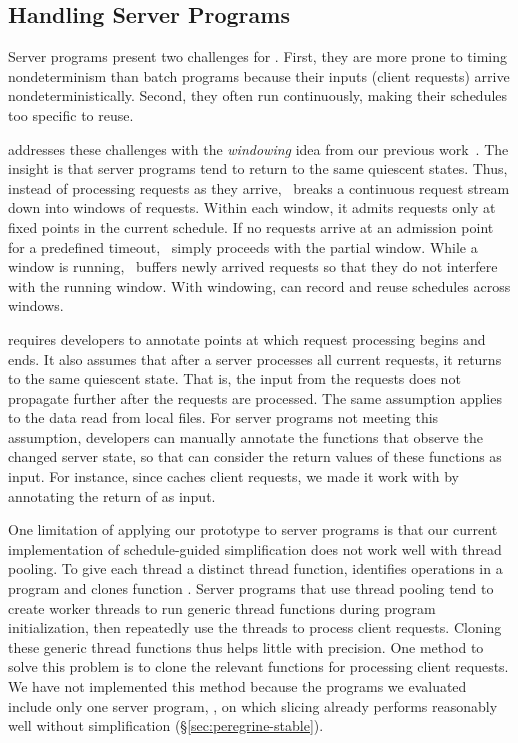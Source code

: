 \subsection{Handling Server Programs} \label{sec:peregrine-window}

Server programs present two challenges for \peregrine.  First, they are more
prone to timing nondeterminism than batch programs because their inputs
(client requests) arrive nondeterministically.  Second, they often run
continuously, making their schedules too specific to reuse.  

\peregrine addresses these challenges with the \emph{windowing} idea from our
previous work~\cite{cui:tern:osdi10}.  The insight is that server programs
tend to return to the same quiescent states.  Thus, instead of processing
requests as they arrive, \peregrine\ breaks a continuous request stream down into
windows of requests.  Within each window, it admits requests only at fixed
points in the current schedule.  If no requests arrive at an admission
point for a predefined timeout, \peregrine\ simply proceeds with the partial
window.  While a window is running, \peregrine\ buffers newly arrived requests
so that they do not interfere with the running window.  With windowing,
\peregrine can record and reuse schedules across windows.

\peregrine requires developers to annotate points at which request processing begins and
ends.  It also assumes that after a server processes all current requests,
it returns to the same quiescent state.  That is, the input from
the requests does not propagate further after the requests are processed.
The same assumption applies to the data read from local files.
For server programs not meeting this assumption, developers can manually
annotate the functions that observe the changed server state, so that \peregrine
can consider the return values of these functions as input.
For instance, since \apache caches client requests, we made it work with \peregrine
by annotating the return of  as input.

One limitation of applying our \peregrine prototype to server programs is that our current
implementation of schedule-guided simplification does not work well with
thread pooling.  To give each thread a distinct thread
function, \peregrine identifies  operations in
a program and clones function .  Server programs that use
thread pooling tend to create worker threads to run generic thread
functions during program initialization, then repeatedly use the threads
to process client requests.  Cloning these generic thread functions thus
helps little with precision.  One method to solve this problem is to clone
the relevant functions for processing client requests.  We have not
implemented this method because the programs we evaluated include only one server
program, \apache, on which slicing already performs reasonably well
without simplification (\S\ref{sec:peregrine-stable}).


